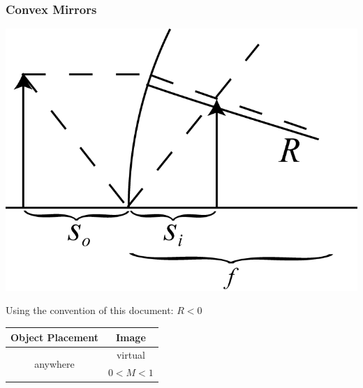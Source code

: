 \subsubsection{Convex Mirrors}
\begin{center}
\includegraphics[scale=0.6]{images/PGRE_Figures_3p2p3_Convex_Mirror.png}
\end{center}
Using the convention of this document: \(R<0\)
\begin{center}
  \begin{tabular}{ c | c  }
    Object Placement & Image \\ \hline%
    \multirow{2}{*}{ anywhere} & virtual \\
    & \(0<M<1\) \\
    \hline
  \end{tabular}
\end{center}

